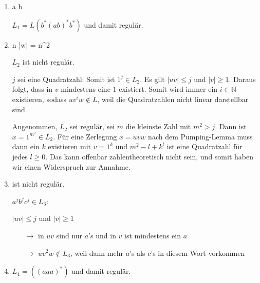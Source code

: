 \documentclass{bschlangaul-aufgabe}
\begin{document}
\begin{enumerate}


\item {}
{ a  b}

\begin{bAntwort}
$L_1 = L(b^* (ab)^* b^*)$ und damit regulär.
\end{bAntwort}


\item {}
{\exists n \in {}  |w| = n^2}

\begin{bAntwort}
$L_2$ ist nicht regulär.


$j$ sei eine Quadratzahl: Somit ist $1^j \in L_2$. Es gilt $|uv| \leq j$
und $|v| \geq 1$. Daraus folgt, dass in $v$ mindestens eine $1$
existiert. Somit wird immer ein $i \in \mathbb{N}$ existieren, sodass
$uv^iw \notin L$, weil die Quadratzahlen nicht linear darstellbar sind.


Angenommen, $L_2$ sei regulär, sei $m$ die kleinste Zahl mit $m^2 > j$.
Dann ist $x = 1^{m^2} \in L_2$. Für eine Zerlegung $x = uvw$ nach dem
Pumping-Lemma muss dann ein $k$ existieren mit $v = 1^k$ und $m^2 - l +
k^l$ ist eine Quadratzahl für jedes $l \geq 0$. Das kann offenbar
zahlentheoretisch nicht sein, und somit haben wir einen Widerspruch zur
Annahme.
\end{bAntwort}


\item {}

\begin{bAntwort}
 ist nicht regulär.

$a^j b^j c^j \in L_3$:

$|uv| \leq j$ und $|v| \geq 1$

\begin{itemize}
\item[$\rightarrow$]
in $uv$ sind nur $a$’s und in $v$ ist mindestens ein $a$

\item[$\rightarrow$]
$u v^2 w \notin L_3$, weil dann mehr $a$’s als $c$’s in diesem Wort
vorkommen
\end{itemize}
\end{bAntwort}


\item {}

\begin{bAntwort}
$L_4 = ((aaa)^*)$ und damit regulär.
\end{bAntwort}

\end{enumerate}
\end{document}
